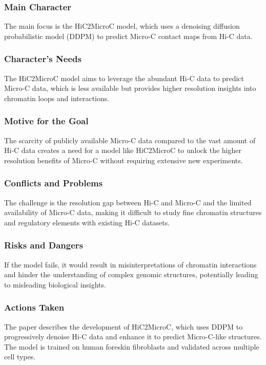 \subsubsection{Main Character}
The main focus is the HiC2MicroC model, which uses a denoising diffusion probabilistic model (DDPM) to predict Micro-C contact maps from Hi-C data.

\subsubsection{Character's Needs}
The HiC2MicroC model aims to leverage the abundant Hi-C data to predict Micro-C data, which is less available but provides higher resolution insights into chromatin loops and interactions.

\subsubsection{Motive for the Goal}
The scarcity of publicly available Micro-C data compared to the vast amount of Hi-C data creates a need for a model like HiC2MicroC to unlock the higher resolution benefits of Micro-C without requiring extensive new experiments.

\subsubsection{Conflicts and Problems}
The challenge is the resolution gap between Hi-C and Micro-C and the limited availability of Micro-C data, making it difficult to study fine chromatin structures and regulatory elements with existing Hi-C datasets.

\subsubsection{Risks and Dangers}
If the model fails, it would result in misinterpretations of chromatin interactions and hinder the understanding of complex genomic structures, potentially leading to misleading biological insights.

\subsubsection{Actions Taken}
The paper describes the development of HiC2MicroC, which uses DDPM to progressively denoise Hi-C data and enhance it to predict Micro-C-like structures. The model is trained on human foreskin fibroblasts and validated across multiple cell types.

